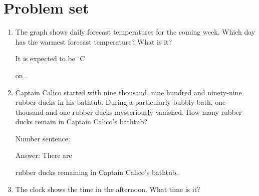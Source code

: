 \documentclass{tufte-book}
\begin{document}
\clearpage\section{Problem set }

\begin{enumerate}
  \item {}
  The graph shows daily forecast temperatures for the coming week.
  Which day has the warmest forecast temperature? What is it?\medskip
  
  It is expected to be \dotfill$^{\circ}$C\medskip\par
  on \dotfill\medskip.
  
\item
  Captain Calico started with nine thousand, nine hundred and
  ninety-nine rubber ducks in his bathtub. During a particularly bubbly
  bath, one thousand and one rubber ducks mysteriously vanished. How
  many rubber ducks remain in Captain Calico's
  bathtub?\medskip

  Number sentence:
  \dotfill\medskip\par

  Answer: There are
  \dotfill\medskip\par\mbox{}\dotfill\medskip\par\mbox{}\dotfill\bigskip
  rubber ducks remaining in Captain Calico's bathtub.

\item {}
The clock shows the time in the afternoon. What time is it?\medskip


\end{enumerate}
\end{document}
